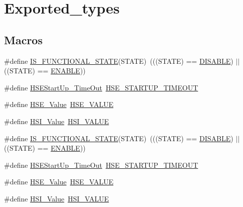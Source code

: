 \hypertarget{group___exported__types}{}\section{Exported\+\_\+types}
\label{group___exported__types}
\subsection*{Macros}
\begin{DoxyCompactItemize}
\item 
\#define \hyperlink{group___exported__types_gaffaf7c3f537d7a3370b1bbdda67a2bf6}{I\+S\+\_\+\+F\+U\+N\+C\+T\+I\+O\+N\+A\+L\+\_\+\+S\+T\+A\+TE}(S\+T\+A\+TE)~(((S\+T\+A\+TE) == \hyperlink{group___l_p_c___types___public___types_ggac9a7e9a35d2513ec15c3b537aaa4fba1ad3a9df141be0ccf10389b640f492b26d}{D\+I\+S\+A\+B\+LE}) $\vert$$\vert$ ((S\+T\+A\+TE) == \hyperlink{group___l_p_c___types___public___types_ggac9a7e9a35d2513ec15c3b537aaa4fba1a7d46875fa3ebd2c34d2756950eda83bf}{E\+N\+A\+B\+LE}))
\item 
\#define \hyperlink{group___exported__types_ga7e69dacd5c3b950b5b1786d7336b30d3}{H\+S\+E\+Start\+Up\+\_\+\+Time\+Out}~\hyperlink{group___library__configuration__section_ga68ecbc9b0a1a40a1ec9d18d5e9747c4f}{H\+S\+E\+\_\+\+S\+T\+A\+R\+T\+U\+P\+\_\+\+T\+I\+M\+E\+O\+UT}
\item 
\#define \hyperlink{group___exported__types_gab12a1abe6dd0001e7a0487a8b175b28c}{H\+S\+E\+\_\+\+Value}~\hyperlink{group___library__configuration__section_gaeafcff4f57440c60e64812dddd13e7cb}{H\+S\+E\+\_\+\+V\+A\+L\+UE}
\item 
\#define \hyperlink{group___exported__types_ga5718ca1fe0825cdbebb466886cfb5016}{H\+S\+I\+\_\+\+Value}~\hyperlink{group___library__configuration__section_gaaa8c76e274d0f6dd2cefb5d0b17fbc37}{H\+S\+I\+\_\+\+V\+A\+L\+UE}
\item 
\#define \hyperlink{group___exported__types_gaffaf7c3f537d7a3370b1bbdda67a2bf6}{I\+S\+\_\+\+F\+U\+N\+C\+T\+I\+O\+N\+A\+L\+\_\+\+S\+T\+A\+TE}(S\+T\+A\+TE)~(((S\+T\+A\+TE) == \hyperlink{group___l_p_c___types___public___types_ggac9a7e9a35d2513ec15c3b537aaa4fba1ad3a9df141be0ccf10389b640f492b26d}{D\+I\+S\+A\+B\+LE}) $\vert$$\vert$ ((S\+T\+A\+TE) == \hyperlink{group___l_p_c___types___public___types_ggac9a7e9a35d2513ec15c3b537aaa4fba1a7d46875fa3ebd2c34d2756950eda83bf}{E\+N\+A\+B\+LE}))
\item 
\#define \hyperlink{group___exported__types_ga7e69dacd5c3b950b5b1786d7336b30d3}{H\+S\+E\+Start\+Up\+\_\+\+Time\+Out}~\hyperlink{group___library__configuration__section_ga68ecbc9b0a1a40a1ec9d18d5e9747c4f}{H\+S\+E\+\_\+\+S\+T\+A\+R\+T\+U\+P\+\_\+\+T\+I\+M\+E\+O\+UT}
\item 
\#define \hyperlink{group___exported__types_gab12a1abe6dd0001e7a0487a8b175b28c}{H\+S\+E\+\_\+\+Value}~\hyperlink{group___library__configuration__section_gaeafcff4f57440c60e64812dddd13e7cb}{H\+S\+E\+\_\+\+V\+A\+L\+UE}
\item 
\#define \hyperlink{group___exported__types_ga5718ca1fe0825cdbebb466886cfb5016}{H\+S\+I\+\_\+\+Value}~\hyperlink{group___library__configuration__section_gaaa8c76e274d0f6dd2cefb5d0b17fbc37}{H\+S\+I\+\_\+\+V\+A\+L\+UE}
\end{DoxyCompactItemize}
